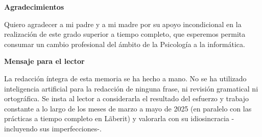 \documentclass[a4paper,12pt]{report}
\begin{document}
	\clearpage
	\thispagestyle{empty}  %
	\begin{center}
		\vspace*{3cm}
		
		{\LARGE \textbf{Agradecimientos}} %
		
		\vspace{1cm}
		
		\begin{minipage}{0.8\textwidth}
			\large
			Quiero agradecer a mi padre y a mi madre por su apoyo incondicional en la realización de este grado superior a tiempo completo, que esperemos permita consumar un cambio profesional del ámbito de la Psicología a la informática.
		\end{minipage}
		
		\vspace{4cm}
		
		{\LARGE \textbf{Mensaje para el lector}} %
		
		\vspace{1cm}
		
		\begin{minipage}{0.8\textwidth}
			\large
			La redacción íntegra de esta memoria se ha hecho a mano. No se ha utilizado inteligencia artificial para la redacción de ninguna frase, ni revisión gramatical ni ortográfica. Se insta al lector a considerarla el resultado del esfuerzo y trabajo constante a lo largo de los meses de marzo a mayo de 2025 (en paralelo con las prácticas a tiempo completo en Lãberit) y valorarla con su idiosincracia -incluyendo sus imperfecciones-.
		\end{minipage}
		
		\vspace*{4cm}
		
		

	\end{center}
	\clearpage
	
	
	
	
	
	
	
	
	
	
	
	
	
	
	
	
	
	
	
	
	
	
	
	
	
	
\end{document}
